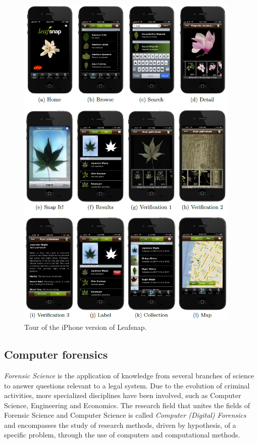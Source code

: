 \begin{figure}[H]
\begin{center}
\includegraphics[width=0.95\textwidth]{fig/LeafSnap}
\end{center}
\caption{Tour of the iPhone version of Leafsnap.}
\label{fig:Leafsnap}
\end{figure}



\subsection{Computer forensics}
{\em  Forensic Science} is the application of knowledge from several branches of science to answer questions relevant to a legal system. Due to the evolution of criminal activities, more
specialized disciplines have been involved, such as Computer Science, Engineering and Economics.
The research field that unites the fields of Forensic Science and Computer Science is called {\em Computer (Digital) Forensics} and encompasses the study of research methods, driven by
hypothesis, of a specific problem, through the use of computers and computational methods.

